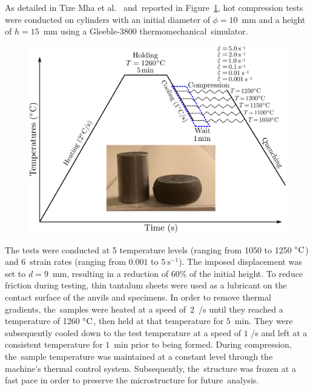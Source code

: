 \documentclass[metals,article,accept,pdftex,moreauthors]{Definitions/mdpi}
\makeatletter
\DeclareRobustCommand{\eal}{et al.\@\xspace}
\DeclareRobustCommand{\ps}{\text{s}^{-1}}
\makeatother
\begin{document}
As detailed in Tize Mha \eal~\cite{TizeMha-2023} and~reported in Figure~\ref{fig:GleebleProcess}, hot compression tests were conducted on cylinders with an initial diameter of $\phi=10$~mm and a height of $h=15$~mm using a Gleeble-3800 thermomechanical~simulator.
\begin{figure}[H]
\centering
\includegraphics[width=0.7\columnwidth]{Figures/GleebleProcess}
\caption{}
\label{fig:GleebleProcess}
\end{figure}
The tests were conducted at 5 temperature levels (ranging from 1050 to 1250 $\celsius$) and 6~strain rates (ranging from $0.001$ to $5~\ps$).
The imposed displacement was set to $d=9$~mm, resulting in a reduction of $60\%$ of the initial height. %
To reduce friction during testing, thin tantalum sheets were used as a lubricant on the contact surface of the anvils and specimens.
In order to remove thermal gradients, the~samples were heated at a speed of~$2$~\celsius/s until they reached a temperature of 1260 $\celsius$, then held at that temperature for $5$~min.
They were subsequently cooled down to the test temperature at a speed of $1$ \celsius/s and left at a consistent temperature for $1$~min prior to being formed.
During compression, the~sample temperature was maintained at a constant level through the machine's thermal control system.
Subsequently, the~structure was frozen at a fast pace in order to preserve the microstructure for future~analysis.
\end{document}
